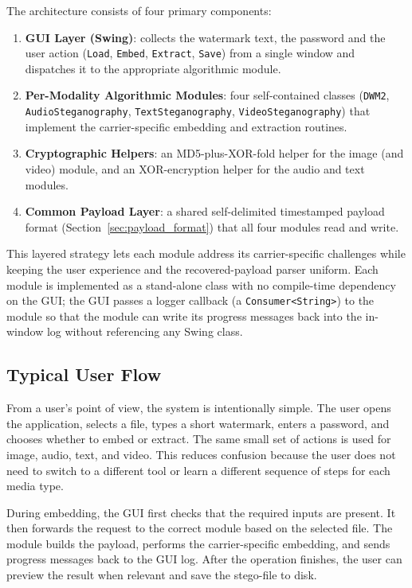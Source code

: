 The architecture consists of four primary components:

\begin{enumerate}
    \item \textbf{GUI Layer (Swing)}: collects the watermark text, the password and the user action (\texttt{Load}, \texttt{Embed}, \texttt{Extract}, \texttt{Save}) from a single window and dispatches it to the appropriate algorithmic module.
    \item \textbf{Per-Modality Algorithmic Modules}: four self-contained classes (\texttt{DWM2}, \texttt{AudioSteganography}, \texttt{TextSteganography}, \texttt{VideoSteganography}) that implement the carrier-specific embedding and extraction routines.
    \item \textbf{Cryptographic Helpers}: an MD5-plus-XOR-fold helper for the image (and video) module, and an XOR-encryption helper for the audio and text modules.
    \item \textbf{Common Payload Layer}: a shared self-delimited timestamped payload format (Section~\ref{sec:payload_format}) that all four modules read and write.
\end{enumerate}

This layered strategy lets each module address its carrier-specific challenges while keeping the user experience and the recovered-payload parser uniform. Each module is implemented as a stand-alone class with no compile-time dependency on the GUI; the GUI passes a logger callback (a \verb|Consumer<String>|) to the module so that the module can write its progress messages back into the in-window log without referencing any Swing class.

\subsection{Typical User Flow}

From a user's point of view, the system is intentionally simple. The user opens the application, selects a file, types a short watermark, enters a password, and chooses whether to embed or extract. The same small set of actions is used for image, audio, text, and video. This reduces confusion because the user does not need to switch to a different tool or learn a different sequence of steps for each media type.

During embedding, the GUI first checks that the required inputs are present. It then forwards the request to the correct module based on the selected file. The module builds the payload, performs the carrier-specific embedding, and sends progress messages back to the GUI log. After the operation finishes, the user can preview the result when relevant and save the stego-file to disk.

